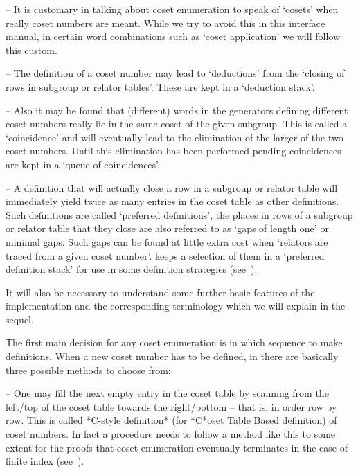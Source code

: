 \item{--} It is customary in  talking about coset enumeration to speak
of \lq{}cosets' when really coset  numbers are meant. While  we try to
avoid this in this interface manual, in certain word combinations such
as \lq{}coset application' we will follow this custom.

\item{--} The   definition   of   a   coset   number   may   lead   to
\lq{}deductions' from the \lq{}closing of rows in subgroup or  relator
tables'. These are kept in a \lq{}deduction stack'.

\item{--} Also   it  may  be  found  that  (different)  words  in  the
generators defining different coset numbers really  lie  in  the  same
coset of the given subgroup. This is called  a  \lq{}coincidence'  and
will eventually lead to the elimination of the larger of the two coset
numbers.  Until  this   elimination   has   been   performed   pending
coincidences are kept in a \lq{}queue of coincidences'.

\item{--} A definition that will actually close a row in a subgroup or
relator table will immediately yield twice  as  many  entries  in  the
coset  table  as  other  definitions.  Such  definitions  are   called
\lq{}preferred definitions', the places  in  rows  of  a  subgroup  or
relator table that they close are also referred  to  as  \lq{}gaps  of
length one' or minimal gaps. Such gaps can be found  at  little  extra
cost when \lq{}relators are traced from a given coset number'.  {\ACE}
keeps a selection of them in a \lq{}preferred  definition  stack'  for
use in some definition strategies (see~\cite{Hav91}).

\endlist

It will also be necessary to understand some further basic features of
the  implementation and  the corresponding  terminology which  we will
explain in the sequel.


The first main decision for any coset enumeration is in which sequence
to make definitions. When a new coset number has  to  be  defined,  in
{\ACE} there are basically three possible methods to choose from:

\beginlist

\item{--} One may fill the next empty entry  in  the  coset  table  by
scanning from the left/top of the coset table towards the right/bottom
-- that is, in order row by row. This is called  *C-style  definition*
(for *C*oset Table Based definition)  of  coset  numbers.  In  fact  a
procedure needs to follow a method like this to some  extent  for  the
proofs that coset enumeration eventually terminates  in  the  case  of
finite index (see~\cite{Neu82}).

